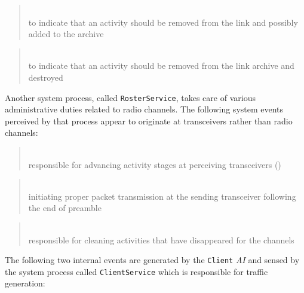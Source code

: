 \begin{quote}
\noindent{}\\ \hspace{0in}
to indicate that an activity should be removed from the link and possibly
added to the archive
\end{quote}

\begin{quote}
\noindent{}\\ \hspace{0in}
to indicate that an activity should be removed from the link archive and
destroyed
\end{quote}\medskip

Another system process, called {\tt RosterService}, takes care of various
administrative duties related to radio channels.
The following system events perceived by that process appear to originate
at transceivers rather than radio channels:

\medskip

\begin{quote}
\noindent{}\\ \hspace{0in}
responsible for advancing activity stages at perceiving
transceivers ()
\end{quote}

\begin{quote}
\noindent{}\\ \hspace{0in}
initiating proper packet transmission at the sending transceiver
following the end of preamble
\end{quote}

\begin{quote}
\noindent{}\\ \hspace{0in}
responsible for cleaning activities that have disappeared for the channels
\end{quote}

The following two internal events are generated by the {\tt Client}
{\em AI\/} and sensed by the system process called {\tt ClientService} which is
responsible for traffic generation:


